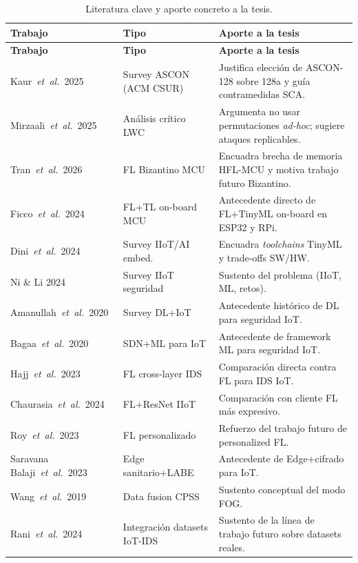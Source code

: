 \begin{appendix}
\begin{longtable}{@{}p{} p{} p{}@{}}
\caption{Literatura clave y aporte concreto a la tesis.}
\label{tab:anx_literatura_clave}\\
\toprule
\textbf{Trabajo} & \textbf{Tipo} & \textbf{Aporte a la tesis} \\
\midrule
\endfirsthead
\toprule
\textbf{Trabajo} & \textbf{Tipo} & \textbf{Aporte a la tesis} \\
\midrule
\endhead
Kaur~\textit{et~al.}~2025 \cite{Kaur2025_ASCON_Survey} & Survey ASCON (ACM CSUR) & Justifica elección de ASCON-128 sobre 128a y guía contramedidas SCA. \\
Mirzaali~\textit{et~al.}~2025 \cite{Mirzaali2025_LWC_Permutations} & Análisis crítico LWC & Argumenta no usar permutaciones \emph{ad-hoc}; sugiere ataques replicables. \\
Tran~\textit{et~al.}~2026 \cite{Tran2026_EdgeTrustShard} & FL Bizantino MCU & Encuadra brecha de memoria HFL-MCU y motiva trabajo futuro Bizantino. \\
Ficco~\textit{et~al.}~2024 \cite{Ficco2024_FL_TinyML_Onboard} & FL+TL on-board MCU & Antecedente directo de FL+TinyML on-board en ESP32 y RPi. \\
Dini~\textit{et~al.}~2024 \cite{Dini2024_EmbeddedIIoT_Review} & Survey IIoT/AI embed. & Encuadra \emph{toolchains} TinyML y trade-offs SW/HW. \\
Ni \& Li 2024 \cite{Ni2024_IIoT_Security_Survey} & Survey IIoT seguridad & Sustento del problema (IIoT, ML, retos). \\
Amanullah~\textit{et~al.}~2020 \cite{Amanullah2020_DL_BigData_IoT_Security} & Survey DL+IoT & Antecedente histórico de DL para seguridad IoT. \\
Bagaa~\textit{et~al.}~2020 \cite{Bagaa2020_ML_IoT_Framework} & SDN+ML para IoT & Antecedente de framework ML para seguridad IoT. \\
Hajj~\textit{et~al.}~2023 \cite{Hajj2023_CrossLayerFL_IDS} & FL cross-layer IDS & Comparación directa contra FL para IDS IoT. \\
Chaurasia~\textit{et~al.}~2024 \cite{Chaurasia2024_FL_ResNet_IIoT} & FL+ResNet IIoT & Comparación con cliente FL más expresivo. \\
Roy~\textit{et~al.}~2023 \cite{Roy2023_FL_AdaptedModel} & FL personalizado & Refuerzo del trabajo futuro de personalized FL. \\
Saravana Balaji~\textit{et~al.}~2023 \cite{SaravanaBalaji2023_EdgeIoT_DL} & Edge sanitario+LABE & Antecedente de Edge+cifrado para IoT. \\
Wang~\textit{et~al.}~2019 \cite{Wang2019_DataFusion_CPSS} & Data fusion CPSS & Sustento conceptual del modo FOG. \\
Rani~\textit{et~al.}~2024 \cite{Rani2024_IoT_IDS_Datasets} & Integración datasets IoT-IDS & Sustento de la línea de trabajo futuro sobre datasets reales. \\
\bottomrule
\end{longtable}

\end{appendix}
